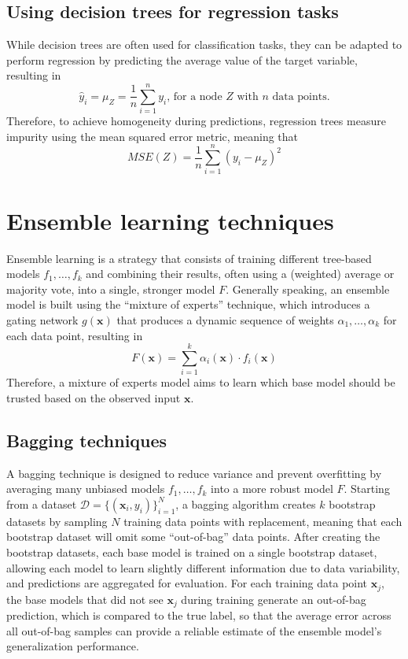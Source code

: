 \documentclass{report}
\begin{document}
\subsection{Using decision trees for regression tasks}
While decision trees are often used for classification tasks, they can be adapted to perform regression by predicting the average value of the target variable, resulting in
\[\hat{y}_i = \mu_Z = \frac{1}{n}\sum_{i = 1}^n y_i \text{, for a node $Z$ with $n$ data points.}\]
Therefore, to achieve homogeneity during predictions, regression trees measure impurity using the mean squared error metric, meaning that
\[MSE(Z) = \frac{1}{n}\sum_{i = 1}^n (y_i - \mu_Z)^2\]
\section{Ensemble learning techniques}
Ensemble learning is a strategy that consists of training different tree-based models $\displaystyle f_1, \dots, f_k$ and combining their results, often using a (weighted) average or majority vote, into a single, stronger model $\displaystyle F$. \newline
Generally speaking, an ensemble model is built using the ``mixture of experts'' technique, which introduces a gating network $\displaystyle g(\mathbf{x})$ that produces a dynamic sequence of weights $\displaystyle \alpha_1, \dots, \alpha_k$ for each data point, resulting in
\[F(\mathbf{x}) = \sum_{i = 1}^k \alpha_i(\mathbf{x}) \cdot f_i(\mathbf{x})\]
Therefore, a mixture of experts model aims to learn which base model should be trusted based on the observed input $\displaystyle \mathbf{x}$.
\subsection{Bagging techniques}
A bagging technique is designed to reduce variance and prevent overfitting by averaging many unbiased models $\displaystyle f_1, \dots, f_k$ into a more robust model $\displaystyle F$. \newline
Starting from a dataset $\displaystyle \mathcal{D} = \{(\mathbf{x}_i, y_i)\}_{i = 1}^N$, a bagging algorithm creates $\displaystyle k$ bootstrap datasets by sampling $\displaystyle N$ training data points with replacement, meaning that each bootstrap dataset will omit some ``out-of-bag'' data points. \newline
After creating the bootstrap datasets, each base model is trained on a single bootstrap dataset, allowing each model to learn slightly different information due to data variability, and predictions are aggregated for evaluation. \newline
For each training data point $\displaystyle \mathbf{x}_j$, the base models that did not see $\displaystyle \mathbf{x}_j$ during training generate an out-of-bag prediction, which is compared to the true label, so that the average error across all out-of-bag samples can provide a reliable estimate of the ensemble model's generalization performance.
\end{document}
